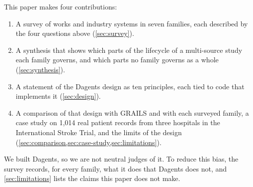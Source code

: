 This paper makes four contributions:
\begin{enumerate}
  \item A survey of \SurveyWorks{} works and industry systems in seven families,
        each described by the four questions above (\cref{sec:survey}).
  \item A synthesis that shows which parts of the lifecycle of a multi-source
        study each family governs, and which parts no family governs as a whole
        (\cref{sec:synthesis}).
  \item A statement of the Dagents design as ten principles, each tied to code
        that implements it (\cref{sec:design}).
  \item A comparison of that design with GRAILS and with each surveyed family,
        a case study on 1,014 real patient records from three hospitals in the
        International Stroke Trial, and the limits of the design
        (\cref{sec:comparison,sec:case-study,sec:limitations}).
\end{enumerate}

We built Dagents, so we are not neutral judges of it. To reduce this bias, the
survey records, for every family, what it does that Dagents does not, and
\cref{sec:limitations} lists the claims this paper does not make.
